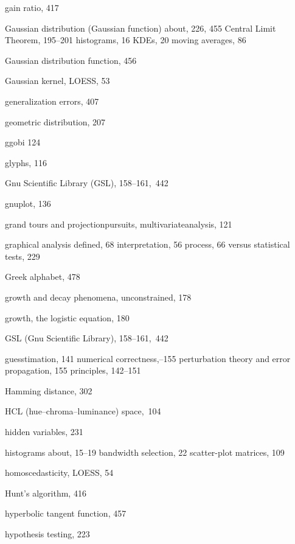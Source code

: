 \documentclass{Oreilly5980006}
\begin{document}
\begin{theindex}
  \item gain ratio, 417
  \item Gaussian distribution (Gaussian function)
    \subitem about, 226, 455
    \subitem Central Limit Theorem, 195--201
    \subitem histograms, 16
    \subitem KDEs, 20
    \subitem moving averages, 86
  \item Gaussian distribution function, 456
  \item Gaussian kernel, LOESS, 53
  \item generalization errors, 407
  \item geometric distribution, 207
  \item ggobi 124
  \item glyphs, 116
  \item Gnu Scientific Library (GSL), 158--161,~442
  \item gnuplot, 136
  \item grand tours and projection\break pursuits, multivariate\break analysis, 121
  \item graphical analysis
    \subitem defined, 68
    \subitem interpretation, 56
    \subitem process, 66
    \subitem versus statistical tests, 229
  \item Greek alphabet, 478
  \item growth and decay phenomena, unconstrained, 178
  \item growth, the logistic equation, 180
  \item GSL (Gnu Scientific Library), 158--161,~442
  \item guesstimation, 141
    \subitem numerical correctness,--155
    \subitem perturbation theory and error propagation, 155
    \subitem principles, 142--151

  \indexspace

  \item Hamming distance, 302
  \item HCL (hue--chroma--luminance) space,~104
  \item hidden variables, 231
  \item histograms
    \subitem about, 15--19
    \subitem bandwidth selection, 22
    \subitem scatter-plot matrices, 109
  \item homoscedasticity, LOESS, 54
  \item Hunt's algorithm, 416
  \item hyperbolic tangent function, 457
  \item hypothesis testing, 223


\end{theindex}
\end{document}
